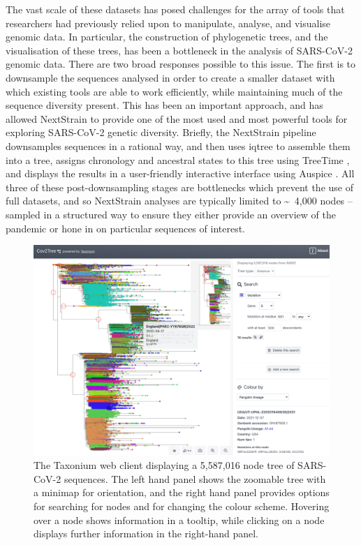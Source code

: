 The vast scale of these datasets has posed challenges for the array of tools that researchers had previously relied upon to manipulate, analyse, and visualise genomic data. In particular, the construction of phylogenetic trees, and the visualisation of these trees, has been a bottleneck in the analysis of SARS-CoV-2 genomic data. There are two broad responses possible to this issue. The first is to downsample the sequences analysed in order to create a smaller dataset with which existing tools are able to work efficiently, while maintaining much of the sequence diversity present. This has been an important approach, and has allowed NextStrain \citep{nextstrain} to provide one of the most used and most powerful tools for exploring SARS-CoV-2 genetic diversity. Briefly, the NextStrain pipeline downsamples sequences in a rational way, and then uses iqtree \citep{iqtree} to assemble them into a tree, assigns chronology and ancestral states to this tree using TreeTime \citep{treetime}, and displays the results in a user-friendly interactive interface using Auspice \citep{nextstrain}. All three of these post-downsampling stages are bottlenecks which prevent the use of full datasets, and so NextStrain analyses are typically limited to \textasciitilde~4,000 nodes -- sampled in a structured way to ensure they either provide an overview of the pandemic or hone in on particular sequences of interest.

\begin{figure}
\begin{center}
\includegraphics[width=\linewidth]{Figures/screenshot2.png}
\end{center}
\caption{The Taxonium web client displaying a 5,587,016 node tree of SARS-CoV-2 sequences. The left hand panel shows the zoomable tree with a minimap for orientation, and the right hand panel provides options for searching for nodes and for changing the colour scheme. Hovering over a node shows information in a tooltip, while clicking on a node displays further information in the right-hand panel.}
\label{fig:taxonium_client}
\end{figure}

